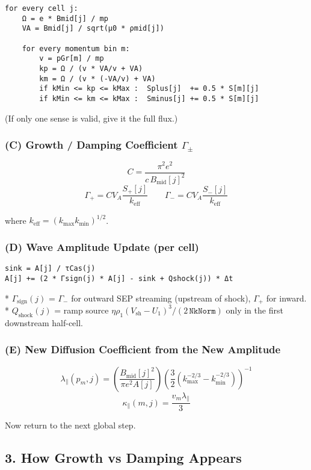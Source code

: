 \begin{verbatim}
for every cell j:
    Ω = e * Bmid[j] / mp
    VA = Bmid[j] / sqrt(μ0 * ρmid[j])

    for every momentum bin m:
        v = pGr[m] / mp
        kp = Ω / (v * VA/v + VA)
        km = Ω / (v * (-VA/v) + VA)
        if kMin <= kp <= kMax :  Splus[j]  += 0.5 * S[m][j]
        if kMin <= km <= kMax :  Sminus[j] += 0.5 * S[m][j]
\end{verbatim}

(If only one sense is valid, give it the full flux.)

\subsubsection*{(C) Growth / Damping Coefficient $\Gamma_{\pm}$}

\[
C = \frac{\pi^2 e^2}{c\,B_{\text{mid}}[j]^2}
\]
\[
\Gamma_{+} = C V_A \frac{S_{+}[j]}{k_{\text{eff}}}
\qquad
\Gamma_{-} = C V_A \frac{S_{-}[j]}{k_{\text{eff}}}
\]

where $k_{\text{eff}} = (k_{\max} k_{\min})^{1/2}$.

\subsubsection*{(D) Wave Amplitude Update (per cell)}

\begin{verbatim}
sink = A[j] / τCas(j)
A[j] += (2 * Γsign(j) * A[j] - sink + Qshock(j)) * Δt
\end{verbatim}

* $\Gamma_{\text{sign}}(j)$ = $\Gamma_{-}$ for outward SEP streaming (upstream of shock), $\Gamma_{+}$ for inward.
* $Q_{\text{shock}}(j)$ = ramp source $\eta \rho_1 (V_{\text{sh}}-U_1)^3 / (2\,\texttt{NkNorm})$ only in the first downstream half-cell.

\subsubsection*{(E) New Diffusion Coefficient from the New Amplitude}

\[
\lambda_\parallel(p_m,j) =
\left( \frac{B_{\text{mid}}[j]^2}{\pi e^2 A[j]} \right)
\left( \frac{3}{2} (k_{\max}^{-2/3} - k_{\min}^{-2/3}) \right)^{-1}
\]
\[
\kappa_\parallel(m,j) = \frac{v_m \lambda_\parallel}{3}
\]

Now return to the next global step.

\subsection*{3. How Growth vs Damping Appears}

